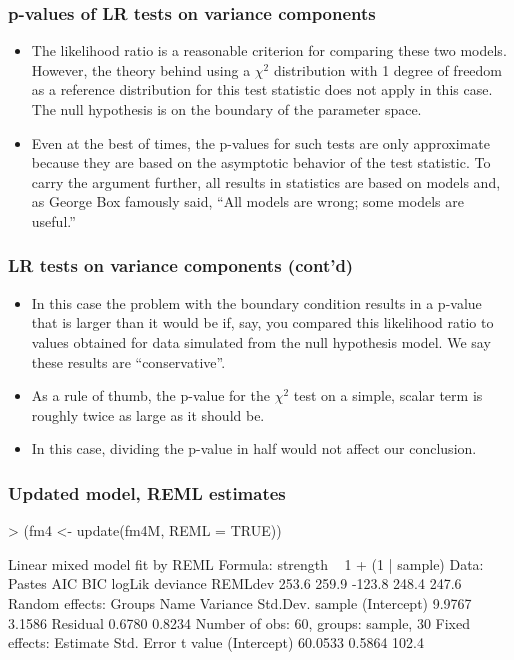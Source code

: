 \begin{frame}
\frametitle{p-values of LR tests on variance components}
\begin{itemize}
\item The likelihood ratio is a reasonable criterion for comparing
  these two models.  However, the theory behind using a $\chi^2$
  distribution with 1 degree of freedom as a reference distribution
  for this test statistic does not apply in this case.  The null
  hypothesis is on the boundary of the parameter space.
\item Even at the best of times, the p-values for such tests are only
  approximate because they are based on the asymptotic behavior of the
  test statistic.  To carry the argument further, all results in
  statistics are based on models and, as George Box famously said,
  ``All models are wrong; some models are useful.''
\end{itemize}
\end{frame}
\begin{frame}
\frametitle{LR tests on variance components (cont'd)}
\begin{itemize}
\item In this case the problem with the boundary condition results in
  a p-value that is larger than it would be if, say, you compared this
  likelihood ratio to values obtained for data simulated from the null
  hypothesis model.  We say these results are ``conservative''.
\item As a rule of thumb, the p-value for the $\chi^2$ test on a
  simple, scalar term is roughly twice as large as it should be.
\item In this case, dividing the p-value in half would not affect our
  conclusion. 
\end{itemize}
\end{frame}

\begin{frame}[fragile]
  \frametitle{Updated model, REML estimates}
\begin{Schunk}
\begin{Sinput}
> (fm4 <- update(fm4M, REML = TRUE))
\end{Sinput}
\begin{Soutput}
Linear mixed model fit by REML 
Formula: strength ~ 1 + (1 | sample) 
   Data: Pastes 
   AIC   BIC logLik deviance REMLdev
 253.6 259.9 -123.8    248.4   247.6
Random effects:
 Groups   Name        Variance Std.Dev.
 sample   (Intercept) 9.9767   3.1586  
 Residual             0.6780   0.8234  
Number of obs: 60, groups: sample, 30
Fixed effects:
            Estimate Std. Error t value
(Intercept)  60.0533     0.5864   102.4
\end{Soutput}
\end{Schunk}
\end{frame}


